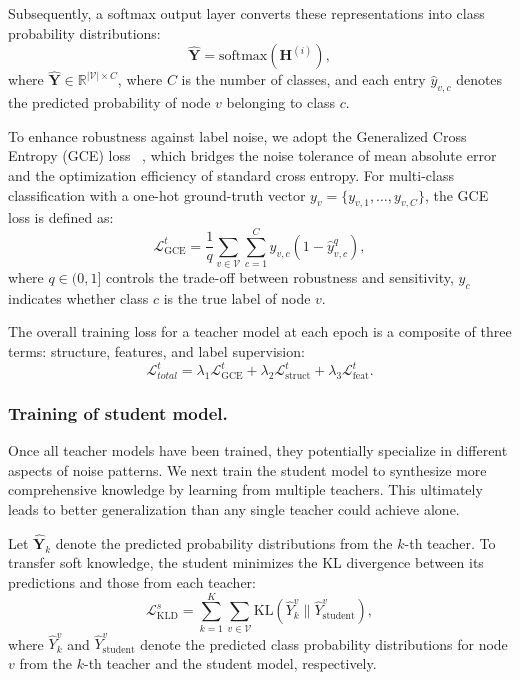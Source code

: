 \documentclass[sigconf, anonymous, review]{acmart}
\begin{document}
      Subsequently, a softmax output layer converts these representations into class probability distributions:
      \begin{equation}
        \hat{\mathbf{Y}} = \text{softmax}(\mathbf{H}^{(i)}),
      \end{equation}
      where $\hat{\mathbf{Y}} \in \mathbb{R}^{|\mathcal{V}|\times C}$, where $C$ is the number of classes, and  each entry $\hat{y}_{v,c}$ denotes the predicted probability of node $v$ belonging to class $c$.

      To enhance robustness against label noise, we adopt the Generalized Cross Entropy (GCE) loss ~\cite{zhang2018generalized}, which bridges the noise tolerance of mean absolute error and the optimization efficiency of standard cross entropy.
      For multi-class classification with a one-hot ground-truth vector 
      $y_v=\{y_{v,1},\dots, y_{v, C}\}$,   the GCE loss is defined as:
      \begin{equation}
        \mathcal{L}^t_{\text{GCE}} = \frac{1}{q} \sum_{v \in \mathcal{V}} \sum_{c=1}^C y_{v,c} \left(1 - \hat{y}_{v,c}^q\right),
      \end{equation}
      where $q \in (0,1]$ controls the trade-off between robustness and sensitivity, $y_c$  indicates whether class  $c$ is the true label of node 
      $v$. 

      The overall training loss for a teacher model at each epoch is a composite of three terms: structure, features, and label supervision:
      \begin{equation}
        \mathcal{L}_{total}^{t} = \lambda_1\mathcal{L}^t_{\text{GCE}}+\lambda_2\mathcal{L}^t_{\text{struct}} + \lambda_3\mathcal{L}^t_{\text{feat}}.
      \end{equation}

    \subsubsection{Training of student model.}
      Once all teacher models have been trained, they potentially specialize in different aspects of noise patterns. We next train the student model to synthesize more comprehensive knowledge by learning from multiple teachers. This ultimately leads to better generalization than any single teacher could achieve alone.

      Let $\hat{\mathbf{Y}}_k$ denote the predicted probability distributions from the $k$-th teacher. To transfer soft knowledge, the student minimizes the KL divergence between its predictions and those from each teacher:
      \begin{equation}
        \mathcal{L}^s_{\text{KLD}} = \sum_{k=1}^K  \sum_{v\in \mathcal{V}}\text{KL}\left(\hat{Y}_k^{v} \parallel \hat{Y}_{\text{student}}^{v}\right),
      \end{equation}
      where $\hat{Y}_k^{v}$ and $\hat{Y}_{\text{student}}^{v}$ denote the predicted class probability distributions for node $v$ from the $k$-th teacher and the student model, respectively.
\end{document}
